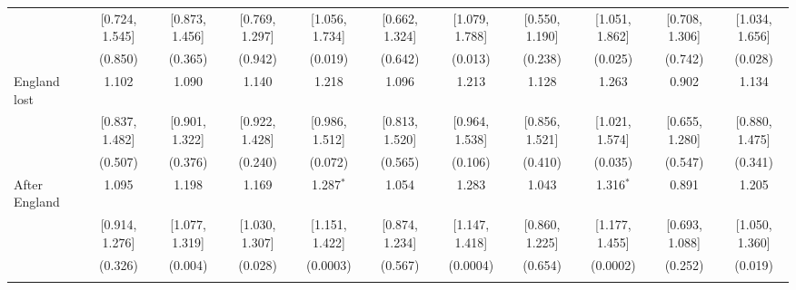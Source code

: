 \documentclass[12pt, a4paper]{article}
\begin{document}
\begin{table}
{\begin{threeparttable}
\begin{tabular}{@{\extracolsep{5pt}}lcccccccccc}
  & [0.724, 1.545] & [0.873, 1.456] & [0.769, 1.297] & [1.056, 1.734] & [0.662, 1.324] & [1.079, 1.788] & [0.550, 1.190] & [1.051, 1.862] & [0.708, 1.306] & [1.034, 1.656] \\
  & (0.850) & (0.365) & (0.942) & (0.019) & (0.642) & (0.013) & (0.238) & (0.025) & (0.742) & (0.028) \\
  England lost & 1.102 & 1.090 & 1.140 & 1.218 & 1.096 & 1.213 & 1.128 & 1.263 & 0.902 & 1.134 \\
  & [0.837, 1.482] & [0.901, 1.322] & [0.922, 1.428] & [0.986, 1.512] & [0.813, 1.520] & [0.964, 1.538] & [0.856, 1.521] & [1.021, 1.574] & [0.655, 1.280] & [0.880, 1.475] \\
  & (0.507) & (0.376) & (0.240) & (0.072) & (0.565) & (0.106) & (0.410) & (0.035) & (0.547) & (0.341) \\
  After England & 1.095 & 1.198 & 1.169 & 1.287$^{*}$ & 1.054 & 1.283 & 1.043 & 1.316$^{*}$ & 0.891 & 1.205 \\
  & [0.914, 1.276] & [1.077, 1.319] & [1.030, 1.307] & [1.151, 1.422] & [0.874, 1.234] & [1.147, 1.418] & [0.860, 1.225] & [1.177, 1.455] & [0.693, 1.088] & [1.050, 1.360] \\
  & (0.326) & (0.004) & (0.028) & (0.0003) & (0.567) & (0.0004) & (0.654) & (0.0002) & (0.252) & (0.019) \\
 \hline \\[-1.8ex]


\end{tabular}
\end{threeparttable}}
\end{table}
\end{document}
